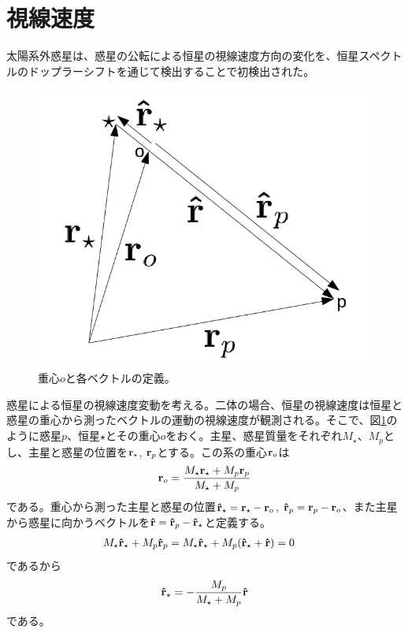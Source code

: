 \section{視線速度}\label{sec:rv}

太陽系外惑星は、惑星の公転による恒星の視線速度方向の変化を、恒星スペクトルのドップラーシフトを通じて検出することで初検出された。

\begin{figure}[]
 \begin{center}
	\includegraphics[bb=0 0 648 537,width=1.0\linewidth]{fig/rvector.png}
\end{center}
	\caption{重心$o$と各ベクトルの定義。\label{fig:rvector}}
\end{figure} 

惑星による恒星の視線速度変動を考える。二体の場合、恒星の視線速度は恒星と惑星の重心から測ったベクトルの運動の視線速度が観測される。そこで、図\ref{fig:rvector}のように惑星$p$、恒星$\star$とその重心$o$をおく。主星、惑星質量をそれぞれ$M_\star$、$M_p$とし、主星と惑星の位置を${\bf r}_\star$, ${\bf r}_p$とする。この系の重心${\bf r}_o$は
\begin{eqnarray}
{\bf r}_o = \frac{M_\star {\bf r}_\star+ M_p {\bf r}_p}{M_\star + M_p}
\label{eq:rbary}
\end{eqnarray}
である。重心から測った主星と惑星の位置${\bf \hat{r}}_\star = {\bf r}_\star - {\bf r}_o$, ${\bf \hat{r}}_p = {\bf r}_p - {\bf r}_o$、また主星から惑星に向かうベクトルを${\bf \hat{r}} = {\bf \hat{r}}_p - {\bf \hat{r}}_\star $と定義する。
\begin{align}
\label{eq:barycentsp}
M_\star {\bf \hat{r}}_\star + M_p {\bf \hat{r}}_p &= M_\star {\bf \hat{r}}_\star + M_p ({\bf \hat{r}}_\star + {\bf \hat{r}} ) = 0 
\end{align}
であるから
\begin{eqnarray}
\label{eq:relpossp}
{\bf \hat{r}}_\star = - \frac{M_p}{M_\star + M_p} {\bf \hat{r}}
\end{eqnarray}
である。


